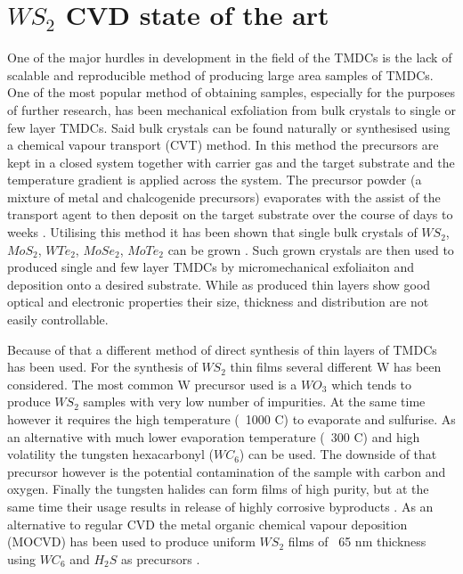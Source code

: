 \section{$WS_2$ CVD state of the art}

One of the major hurdles in development in the field of the TMDCs is the lack of scalable and reproducible method of producing large area samples of TMDCs. One of the most popular method of obtaining samples, especially for the purposes of further research, has been mechanical exfoliation from bulk crystals to single or few layer TMDCs. Said bulk crystals can be found naturally or synthesised using a chemical vapour transport (CVT) method. In this method the precursors are kept in a closed system together with carrier gas and the target substrate and the temperature gradient is applied across the system. The precursor powder (a mixture of metal and chalcogenide precursors) evaporates with the assist of the transport agent to then deposit on the target substrate over the course of days to weeks \cite{Reale2016}\cite{Schmidt2013}. Utilising this method it has been shown that single bulk crystals of $WS_2$, $MoS_2$, $WTe_2$, $MoSe_2$, $MoTe_2$ can be grown \cite{Reale2016}\cite{Schmidt2013}\cite{Al-Hilli1972}\cite{Brixner1962}\cite{Lenz1997}\cite{Brown1966}\cite{Sunil1997}\cite{Lenz1997}. Such grown crystals are then used to produced single and few layer TMDCs by micromechanical exfoliaiton and deposition onto a desired substrate. While as produced thin layers show good optical and electronic properties their size, thickness and distribution are not easily controllable.

Because of that a different method of direct synthesis of thin layers of TMDCs has been used. For the synthesis of $WS_2$ thin films several different W has been considered. The most common W precursor used is a $WO_3$ which tends to produce $WS_2$ samples with very low number of impurities. At the same time however it requires the high temperature (~1000 {\degree}C) to evaporate and sulfurise. As an alternative with much lower evaporation temperature (~300 {\degree}C) and high volatility the tungsten hexacarbonyl ($WC_6$) can be used. The downside of that precursor however is the potential contamination of the sample with carbon and oxygen. Finally the tungsten halides can form films of high purity, but at the same time their usage results in release of highly corrosive byproducts \cite{Reale2016}. As an alternative to regular CVD the metal organic chemical vapour deposition (MOCVD) has been used to produce uniform $WS_2$ films of ~65 nm thickness using $WC_6$ and $H_2S$ as precursors \cite{Chung1998}.

